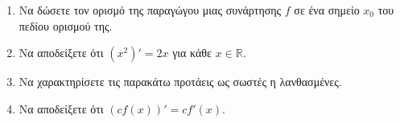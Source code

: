 \begin{enumerate}
\item Να δώσετε τον ορισμό της παραγώγου μιας συνάρτησης $ f $ σε ένα σημείο $ x_0 $ του πεδίου ορισμού της.
\item Να αποδείξετε ότι $ (x^2)'=2x $ για κάθε $ x\in\mathbb{R} $.
\item Να χαρακτηρίσετε τις παρακάτω προτάεις ως σωστές η λανθασμένες.
\item Να αποδείξετε ότι $ (cf(x))'=cf'(x) $.
\end{enumerate}
